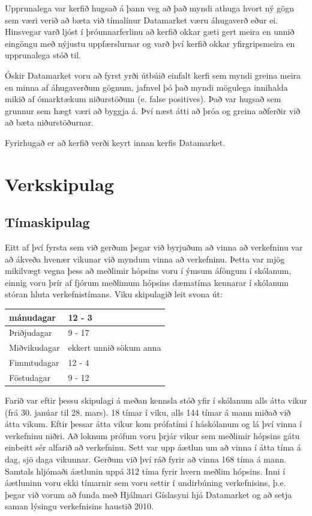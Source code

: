 \documentclass{article}
\begin{document}
Upprunalega var kerfið hugsað á þann veg að það myndi athuga hvort ný gögn sem
væri verið að bæta við tímalínur Datamarket væru áhugaverð eður ei. Hinsvegar
varð ljóst í þróunnarferlinu að kerfið okkar gæti gert meira en unnið
eingöngu með nýjustu uppfærslurnar og varð því kerfið okkar yfirgripsmeira en
upprunalega stóð til.

Óskir Datamarket voru að fyrst yrði útbúið einfalt kerfi 
sem myndi greina meira en minna af áhugaverðum gögnum, jafnvel þó það myndi mögulega 
innihalda mikið af ómarktækum niðurstöðum (e. false positives). Það var hugsað sem 
grunnur sem hægt væri að byggja á. Því næst átti að þróa og greina aðferðir við að 
bæta niðurstöðurnar. 

Fyrirhugað er að kerfið verði keyrt innan kerfis Datamarket.
\newpage

\section{Verkskipulag}

\subsection{Tímaskipulag}

Eitt af því fyrsta sem við gerðum þegar við byrjuðum að vinna að verkefninu var að ákveða hvenær vikunar við myndum vinna að verkefninu. Þetta var mjög mikilvægt vegna þess að meðlimir hópsins voru í ýmsum áföngum í skólanum, einnig voru þrír af fjórum meðlimum hópsins dæmatíma kennarar í skólanum stóran hluta verkefnistímans. 
Viku skipulagið leit svona út:

\vspace{5 mm}
\begin{tabular}{| l | l |}
\hline
  mánudagar & 12 - 3 \\
  \hline
  Þriðjudagar & 9 - 17 \\
  \hline
  Miðvikudagar & ekkert unnið sökum anna \\
  \hline
  Fimmtudagar & 12 - 4 \\
  \hline
  Föstudagar & 9 - 12\\
\hline
\end{tabular}
\vspace{5 mm}

Farið var eftir þessu skipulagi á meðan kennsla stóð yfir í skólanum alls átta vikur (frá 30. janúar til 28. mars). 18 tímar í viku, alls 144 tímar á mann miðað við átta vikum.
Eftir þessar átta vikur kom prófatími í háskólanum og lá því vinna í verkefninu niðri. 
Að loknum prófum voru þrjár vikur sem meðlimir hópsins gátu einbeitt sér alfarið að verkefninu. Sett var upp áætlun um að vinna í átta tíma á dag, sjö daga vikunnar. Gerðum við því ráð fyrir að vinna 168 tíma á mann. 
Samtals hljómaði áætlunin uppá 312 tíma fyrir hvern meðlim hópsins. Inni í áætluninn voru ekki tímarnir sem voru settir í undirbúning verkefnisins, þ.e. þegar við vorum að funda með Hjálmari Gíslasyni hjá Datamarket og að setja saman lýsingu verkefnisins haustið 2010.
\end{document}
